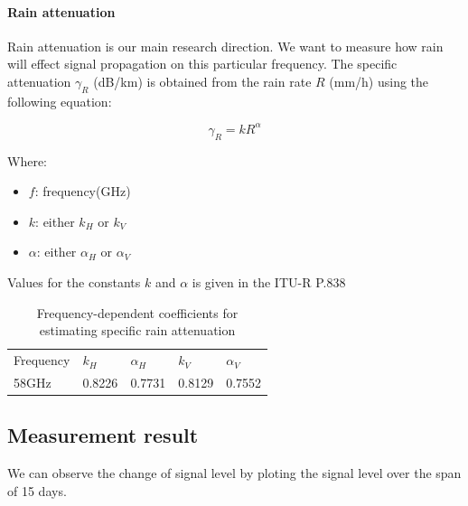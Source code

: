 \paragraph{Rain attenuation}
Rain attenuation is our main research direction. We want to measure how
rain will effect signal propagation on this particular frequency.
The specific attenuation $\gamma_R$ (dB/km) is obtained from the rain rate $R$ (mm/h)
using the following equation:

\begin{equation}
    \gamma_R = kR^{\alpha}
\end{equation}

Where:
\begin{itemize}
    \item $f$: frequency(GHz)
    \item $k$: either $k_H$ or $k_V$
    \item $\alpha$: either $\alpha_H$ or $\alpha_V$
\end{itemize}

Values for the constants $k$ and $\alpha$ is given in the ITU-R P.838 \cite{rain}

\begin{table}[h]\centering
    \begin{tabular}{|l|l|l|l|l|}
        \cline{1-5}
        Frequency & $k_H$ & $\alpha_H$ & $k_V$ & $\alpha_V$\\
        \cline{1-5}
        58GHz & 0.8226 & 0.7731 & 0.8129 & 0.7552 \\
        \cline{1-5}
    \end{tabular}
    \caption{Frequency-dependent coefficients for estimating specific rain attenuation}
\end{table}

\newpage
\subsection{Measurement result}

We can observe the change of signal level by ploting the signal level over the span of 15 days.

